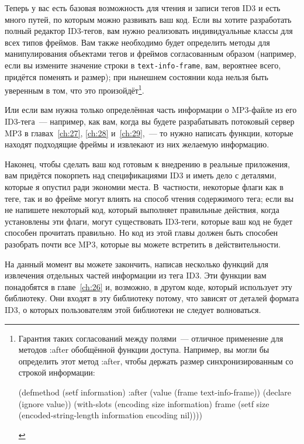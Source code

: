Теперь у вас есть базовая возможность для чтения и записи тегов ID3 и есть много путей,
по которым можно развивать ваш код. Если вы хотите разработать полный редактор ID3-тегов,
вам нужно реализовать индивидуальные классы для всех типов фреймов. Вам также необходимо
будет определить методы для манипулирования объектами тегов и фреймов согласованным
образом (например, если вы измените значение строки в \lstinline{text-info-frame}, вам, вероятнее всего,
придётся поменять и размер); при нынешнем состоянии кода нельзя быть уверенным в том, что
это произойдёт\footnote{Гарантия таких согласований между полями~--- отличное применение
  для методов :after обобщённой функции доступа. Например, вы могли бы определить этот
  метод :after, чтобы держать размер синхронизированным со строкой информации:

\begin{myverb}
(defmethod (setf information) :after (value (frame text-info-frame))
  (declare (ignore value))
  (with-slots (encoding size information) frame
    (setf size (encoded-string-length information encoding nil))))
\end{myverb}
}\hspace{\footnotenegspace}.

Или если вам нужна только определённая часть информации о MP3-файле из его ID3-тега~---
например, как вам, когда вы будете разрабатывать потоковый сервер MP3 в
главах~\ref{ch:27}, \ref{ch:28} и~\ref{ch:29},~--- то нужно написать функции, которые
находят подходящие фреймы и извлекают из них желаемую информацию.

Наконец, чтобы сделать ваш код готовым к внедрению в реальные приложения, вам придётся
покорпеть над спецификациями ID3 и иметь дело с деталями, которые я опустил ради экономии
места. В~частности, некоторые флаги как в теге, так и во фрейме могут влиять на способ
чтения содержимого тега; если вы не напишете некоторый код, который выполняет правильные
действия, когда установлены эти флаги, могут существовать ID3-теги, которые ваш код не
будет способен прочитать правильно. Но код из этой главы должен быть способен разобрать
почти все MP3, которые вы можете встретить в действительности.

На данный момент вы можете закончить, написав несколько функций для извлечения отдельных
частей информации из тега ID3. Эти функции вам понадобятся в главе~\ref{ch:26} и,
возможно, в другом коде, который использует эту библиотеку. Они входят в эту библиотеку
потому, что зависят от деталей формата ID3, о которых пользователям этой библиотеки не
следует волноваться.

